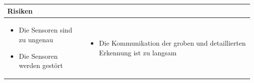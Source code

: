 \begin{table}[h]
\begin{tabular}{p{}p{}}


 \textbf{Risiken} & \\ \hline
	 
\begin{itemize}
\item Die Sensoren sind zu ungenau
\item Die Sensoren werden gestört

\end{itemize}
&
\begin{itemize}
\item Die Kommunikation der groben und detaillierten Erkennung ist zu langsam
\end{itemize}

 
\end{tabular}
\end{table}

\pagebreak



